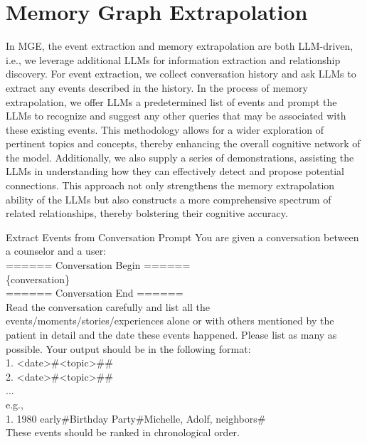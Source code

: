 \section{Memory Graph Extrapolation}\label{appendix:mge}
In MGE, the event extraction and memory extrapolation are both LLM-driven, i.e., we leverage additional LLMs for information extraction and relationship discovery. For event extraction, we collect conversation history and ask LLMs to extract any events described in the history. In the process of memory extrapolation, we offer LLMs a predetermined list of events and prompt the LLMs to recognize and suggest any other queries that may be associated with these existing events. This methodology allows for a wider exploration of pertinent topics and concepts, thereby enhancing the overall cognitive network of the model. Additionally, we also supply a series of demonstrations, assisting the LLMs in understanding how they can effectively detect and propose potential connections. This approach not only strengthens the memory extrapolation ability of the LLMs but also constructs a more comprehensive spectrum of related relationships, thereby bolstering their cognitive accuracy.
\vspace{-4mm}
\begin{mybox}{Extract Events from Conversation Prompt}
You are given a conversation between a counselor and a user: \\
====== Conversation Begin ======  \\
\{conversation\} \\
====== Conversation End ======  \\
Read the conversation carefully and list all the events/moments/stories/experiences alone or with others mentioned by the patient in detail and the date these events happened. Please list as many as possible. Your output should be in the following format: \\
1. <date>\#<topic>\#<people-involved>\#<description in detail> \\
2. <date>\#<topic>\#<people-involved>\#<description in detail> \\
... \\
e.g., \\
1. 1980 early\#Birthday Party\#Michelle, Adolf, neighbors\#<descriptions of this party in detail> \\
These events should be ranked in chronological order. \\
\end{mybox}

